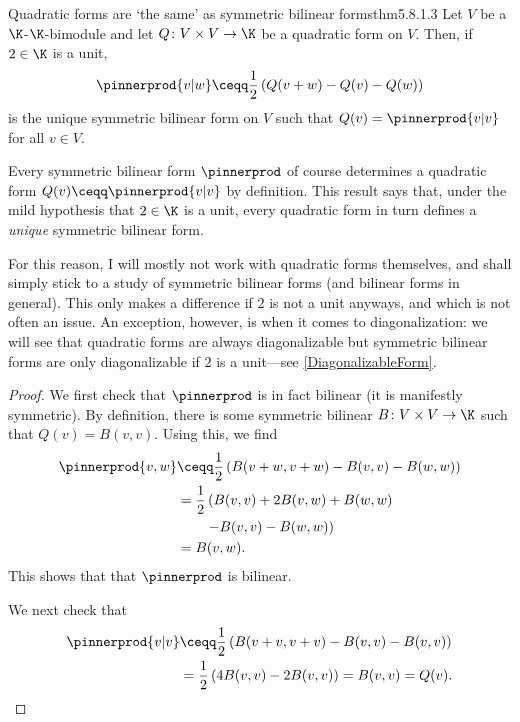 \begin{thm}{Quadratic forms are `the same' as symmetric bilinear forms}{thm5.8.1.3}
	Let $V$ be a $\K$-$\K$-bimodule and let $Q\colon V\times V\rightarrow \K$ be a quadratic form on $V$.  Then, if $2\in \K$ is a unit,
	\begin{equation}
		\pinnerprod{v|w}\ceqq \frac{1}{2}\left( Q(v+w)-Q(v)-Q(w)\right) 
	\end{equation}
	is the unique symmetric bilinear form on $V$ such that $Q(v)=\pinnerprod{v|v}$ for all $v\in V$.
	\begin{rmk}
		Every symmetric bilinear form $\pinnerprod$ of course determines a quadratic form $Q(v)\ceqq \pinnerprod{v|v}$ by definition.  This result says that, under the mild hypothesis that $2\in \K$ is a unit, every quadratic form in turn defines a \emph{unique} symmetric bilinear form.
	\end{rmk}
	\begin{rmk}
		For this reason, I will mostly not work with quadratic forms themselves, and shall simply stick to a study of symmetric bilinear forms (and bilinear forms in general).  This only makes a difference if $2$ is not a unit anyways, and which is not often an issue.  An exception, however, is when it comes to diagonalization:  we will see that quadratic forms are always diagonalizable but symmetric bilinear forms are only diagonalizable if $2$ is a unit---see \cref{DiagonalizableForm}.
	\end{rmk}
	\begin{proof}
		We first check that $\pinnerprod$ is in fact bilinear (it is manifestly symmetric).  By definition, there is some symmetric bilinear $B\colon V\times V\rightarrow \K$ such that $Q(v)=B(v,v)$.  Using this, we find
		\begin{equation}
			\begin{split}
				\pinnerprod{v,w} & \ceqq \frac{1}{2}\left( B(v+w,v+w)-B(v,v)-B(w,w)\right) \\
				& =\frac{1}{2}\left( B(v,v)+2B(v,w)+B(w,w)\right. \\ & \qquad \left. -B(v,v)-B(w,w)\right) \\
				& =B(v,w).
			\end{split} 
		\end{equation}
		This shows that that $\pinnerprod$ is bilinear.
		
		We next check that
		\begin{equation}
			\begin{split}
				\pinnerprod{v|v} & \ceqq \frac{1}{2}\left( B(v+v,v+v)-B(v,v)-B(v,v)\right) \\
				& =\frac{1}{2}\left( 4B(v,v)-2B(v,v)\right) =B(v,v)=Q(v).
			\end{split}
		\end{equation}
		

\end{proof}
\end{thm}

